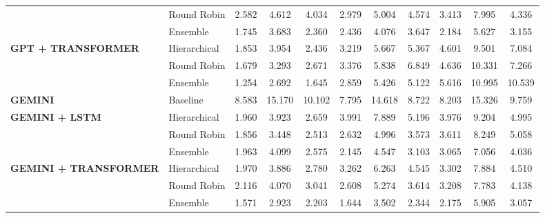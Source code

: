 \begin{table}[t]
{\begin{tabular}{@{}ll | ccc | ccc | ccc@{}}
& Round Robin & 2.582 & 4.612 & 4.034 & 2.979 & 5.004 & 4.574 & 3.413 & 7.995 & 4.336 \\
& Ensemble & 1.745 & 3.683 & 2.360 & 2.436 & 4.076 & 3.647 & 2.184 & 5.627 & 3.155 \\
\midrule
\multirow{3}{*}{\textbf{GPT + TRANSFORMER}} 
& Hierarchical & 1.853 & 3.954 & 2.436 & 3.219 & 5.667 & 5.367 & 4.601 & 9.501 & 7.084 \\
& Round Robin & 1.679 & 3.293 & 2.671 & 3.376 & 5.838 & 6.849 & 4.636 & 10.331 & 7.266 \\
& Ensemble & 1.254 & 2.692 & 1.645 & 2.859 & 5.426 & 5.122 & 5.616 & 10.995 & 10.539 \\
\midrule
\multirow{1}{*}{\textbf{GEMINI}} 
& Baseline & 8.583 & 15.170 & 10.102 & 7.795 & 14.618 & 8.722 & 8.203 & 15.326 & 9.759 \\
\midrule
\multirow{3}{*}{\textbf{GEMINI + LSTM}} 
& Hierarchical & 1.960 & 3.923 & 2.659 & 3.991 & 7.889 & 5.196 & 3.976 & 9.204 & 4.995 \\
& Round Robin & 1.856 & 3.448 & 2.513 & 2.632 & 4.996 & 3.573 & 3.611 & 8.249 & 5.058 \\
& Ensemble & 1.963 & 4.099 & 2.575 & 2.145 & 4.547 & 3.103 & 3.065 & 7.056 & 4.036 \\
\midrule
\multirow{3}{*}{\textbf{GEMINI + TRANSFORMER}} 
& Hierarchical & 1.970 & 3.886 & 2.780 & 3.262 & 6.263 & 4.545 & 3.302 & 7.884 & 4.510 \\
& Round Robin & 2.116 & 4.070 & 3.041 & 2.608 & 5.274 & 3.614 & 3.208 & 7.783 & 4.138 \\
& Ensemble & 1.571 & 2.923 & 2.203 & 1.644 & 3.502 & 2.344 & 2.175 & 5.905 & 3.057 \\
\bottomrule
\end{tabular}
}
\end{table}
